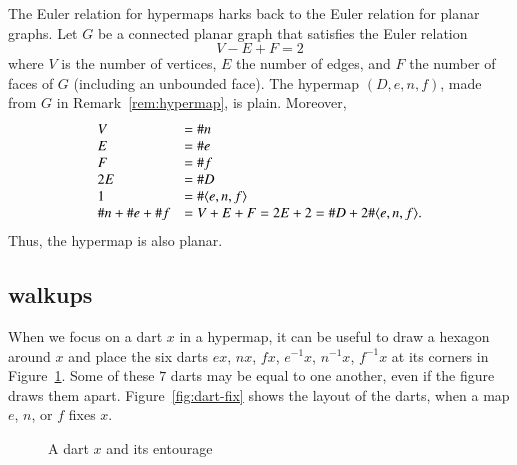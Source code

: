 \begin{remark}  The Euler relation for hypermaps harks back
to the Euler relation for planar graphs.
Let $G$ be a connected planar graph that satisfies the
Euler relation
    $$V - E + F = 2$$
where $V$ is the number of vertices, $E$ the number of edges, and
$F$ the number of faces of $G$ (including an unbounded face). The
hypermap $(D,e,n,f)$, made from $G$ in
Remark~\ref{rem:hypermap}, is plain.
Moreover,
    $$\begin{array}{lll}
    V &= \# n\\
    E &= \# e\\
    F &= \# f\\
    2E &= \# D\\
    1 &= \#\langle e,n,f\rangle\\
    \# n + \#e + \# f &= 
    V + E + F = 2 E + 2 = \# D + 2 \#\langle e,n,f\rangle.
    \end{array}
    $$
Thus, the hypermap is also planar. 
\end{remark}


%
%


\subsection{walkups}

When we focus on a dart $x$ in a
hypermap, it can be useful to draw a hexagon around $x$ and place
the six darts $e x$,
$n x$, $f x$, $e^{-1} x$, $n^{-1} x$, $f^{-1} x$ at its corners
in Figure~\ref{fig:dart+}.  Some of these $7$ darts may be
equal to one another, even if the figure draws them apart.
Figure~\ref{fig:dart-fix} shows the layout of the darts, when 
a map $e$, $n$, or $f$ fixes $x$.

\begin{figure}[htb]
  \centering
  \caption{A dart $x$ and its entourage}
  \label{fig:dart+}
\end{figure}

